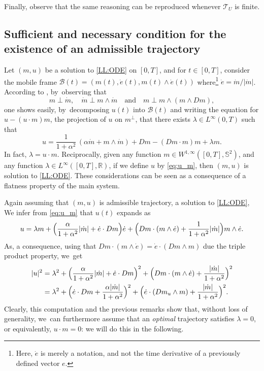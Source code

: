 \documentclass[JEP,XML,SOM,Unicode,NoEqCountersInSection,NoFloatCountersInSection,published]{cedram}
\theoremstyle{definition}
\begin{document}
Finally, observe that the same reasoning can be reproduced whenever $\mathcal{T}_U$ is finite.

\subsection{Sufficient and necessary condition for the existence of an admissible trajectory}

Let $(m,u)$ be a solution to \eqref{LL:ODE} on $[0,T]$, and for $t \in [0,T]$, consider the mobile frame $\mathcal{B}(t)=(m(t),\dot e(t),m(t)\wedge \dot e(t))$ where\footnote{Here, $\dot e$ is merely a notation, and not the time derivative of a previously defined vector $e$.} $\dot{e}=\dot{m}/|\dot{m}|$. According to \cite{alouges2009magnetization}, by~observing that
\[
m \perp \dot m, \quad \dot m \perp m \wedge \dot m \quad \text{and}\quad m \perp m \wedge (m\wedge Dm),
\]
one shows easily, by~decomposing $u(t)$ into $\mathcal{B}(t)$ and writing the equation for \hbox{$u - (u \cdot m) m$}, the projection of $u$ on $m^\perp$, that there exists $\lambda\in L^\infty (0,T)$ such that
\begin{equation} \label{eq:u_m}
u = \frac{1}{1+\alpha^2}\,(\alpha \dot m + m \wedge \dot m)+Dm-(Dm\cdot m)m+\lambda m.
\end{equation}
In fact, $\lambda = u\cdot m$. Reciprocally, given any function $m \in W^{1,\infty}([0,T],\mathbb S^2)$, and any function $\lambda \in L^\infty([0,T],\mathbb R)$, if we define $u$ by \eqref{eq:u_m}, then $(m,u)$ is solution to \eqref{LL:ODE}. These considerations can be seen as a consequence of a flatness property of the main system.

Again assuming that $(m,u)$ is admissible trajectory, \ie a solution to \eqref{LL:ODE}, We infer from \eqref{eq:u_m} that $u(t)$ expands as
\begin{equation}\label{eq:uexpand}
u=\lambda m +\Bigl(\frac{\alpha}{1+\alpha^2}|\dot m|+\dot e\cdot Dm \Bigr)\dot e+\Bigl(Dm \cdot (m \wedge \dot e)+\frac{1}{1+\alpha^2}|\dot m|\Bigr)m \wedge \dot e.
\end{equation}
As, a consequence, using that $Dm \cdot (m \wedge \dot e)=\dot e\cdot (Dm \wedge m)$ due the triple product property, we~get
\begin{align*}
|u|^2 &= \lambda^2+\Bigl(\frac{\alpha}{1+\alpha^2}|\dot m|+\dot e\cdot Dm\Bigr)^2+\Bigl(Dm\cdot (m\wedge \dot e)+\frac{|\dot m|}{1+\alpha^2}\Bigr)^2\\
&= \lambda^2+\Bigl(\dot e\cdot Dm+\frac{\alpha|\dot m|}{1+\alpha^2}\Bigr)^2+\Bigl(\dot e\cdot (Dm_u\wedge m)+\frac{|\dot m|}{1+\alpha^2}\Bigr)^2.
\end{align*}
Clearly, this computation and the previous remarks show that, without loss of generality, we~can furthermore assume that an \emph{optimal} trajectory satisfies $\lambda=0$, or equivalently, $u \cdot m =0$: we will do this in the following.
\end{document}
